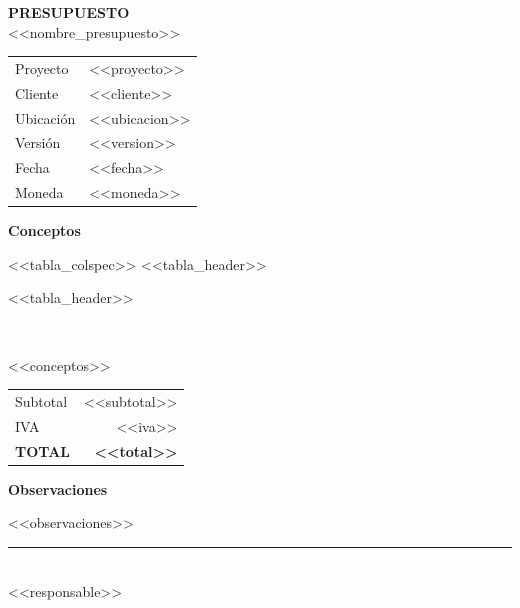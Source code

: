 \documentclass[11pt,a4paper]{article}
\begin{document}
\begin{center}
  {\Huge\color{Principal}\textbf{PRESUPUESTO}}\\[2mm]
  {\Large <<nombre_presupuesto>>}
\end{center}

\vspace{5mm}

\begin{tabularx}{\textwidth}{@{} l X @{}}
  Proyecto    & <<proyecto>>\\
  Cliente     & <<cliente>>\\
  Ubicaci\'on & <<ubicacion>>\\
  Versi\'on   & <<version>>\\
  Fecha       & <<fecha>>\\
  Moneda      & <<moneda>>\\
\end{tabularx}

\vspace{8mm}

{\Large\textbf{Conceptos}}

\renewcommand{\arraystretch}{1.2}
\begin{longtable}{<<tabla_colspec>>}
  \toprule
  <<tabla_header>>
  \midrule
  \endfirsthead

  \toprule
  <<tabla_header>>
  \midrule
  \endhead

  \midrule
  \\
  \endfoot

  \bottomrule
  \endlastfoot

<<conceptos>>

\end{longtable}

\vspace{4mm}
\begin{flushright}
  \begin{tabular}{@{} l r @{}}
    \toprule
    Subtotal       & <<subtotal>>\\
    IVA            & <<iva>>\\
    \midrule
    \textbf{TOTAL} & \textbf{<<total>>}\\
    \bottomrule
  \end{tabular}
\end{flushright}

\vspace{5mm}
{\Large\textbf{Observaciones}}

<<observaciones>>

\vfill
\begin{center}
  \rule{7cm}{0.4pt}\\
  <<responsable>>
\end{center}
\end{document}

